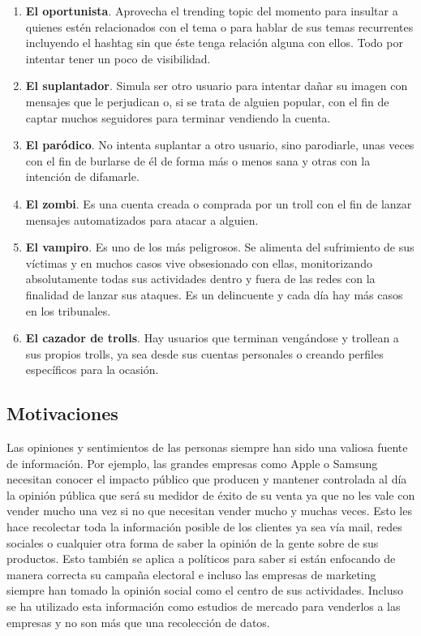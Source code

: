 \documentclass[../all.tex]{subfiles}
\begin{document}
\begin{enumerate}[resume]
        \item \textbf{El oportunista}. Aprovecha el trending topic del momento para insultar a quienes estén relacionados con el tema o para hablar de sus temas recurrentes incluyendo el hashtag sin que éste tenga relación alguna con ellos. Todo por intentar tener un poco de visibilidad.
        \item \textbf{El suplantador}. Simula ser otro usuario para intentar dañar su imagen con mensajes que le perjudican o, si se trata de alguien popular, con el fin de captar muchos seguidores para terminar vendiendo la cuenta.
        \item \textbf{El paródico}. No intenta suplantar a otro usuario, sino parodiarle, unas veces con el fin de burlarse de él de forma más o menos sana y otras con la intención de difamarle.
        \item \textbf{El zombi}. Es una cuenta creada o comprada por un troll con el fin de lanzar mensajes automatizados para atacar a alguien.
        \item \textbf{El vampiro}. Es uno de los más peligrosos. Se alimenta del sufrimiento de sus víctimas y en muchos casos vive obsesionado con ellas, monitorizando absolutamente todas sus actividades dentro y fuera de las redes con la finalidad de lanzar sus ataques. Es un delincuente y cada día hay más casos en los tribunales.
        \item \textbf{El cazador de trolls}. Hay usuarios que terminan vengándose y trollean a sus propios trolls, ya sea desde sus cuentas personales o creando perfiles específicos para la ocasión.
    \end{enumerate}
    
\newpage
\subsection{Motivaciones}
    Las opiniones y sentimientos de las personas siempre han sido una valiosa fuente de información. Por ejemplo, las grandes empresas como Apple o Samsung necesitan conocer el impacto público que producen y mantener controlada al día la opinión pública que será su medidor de éxito de su venta ya que no les vale con vender mucho una vez si no que necesitan vender mucho y muchas veces. Esto les hace recolectar toda la información posible de los clientes ya sea vía mail, redes sociales o cualquier otra forma de saber la opinión de la gente sobre de sus productos. Esto también se aplica a políticos para saber si están enfocando de manera correcta su campaña electoral e incluso las empresas de marketing siempre han tomado la opinión social como el centro de sus actividades. Incluso se ha utilizado esta información como estudios de mercado para venderlos a las empresas y no son más que una recolección de datos.\\
    
\end{document}
